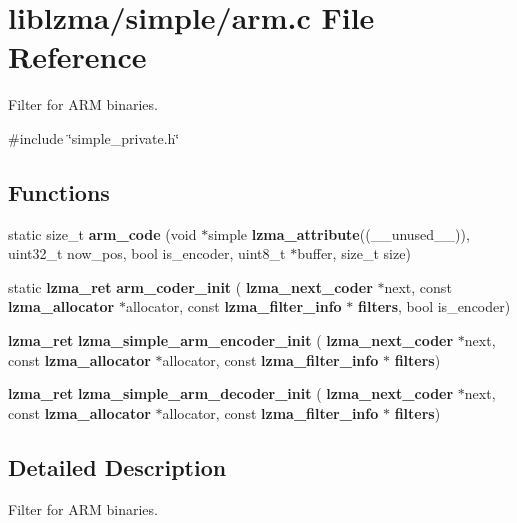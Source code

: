 \section{liblzma/simple/arm.c File Reference}
\label{arm_8c}


Filter for A\+RM binaries.  


{\ttfamily \#include \char`\"{}simple\+\_\+private.\+h\char`\"{}}\newline
\subsection*{Functions}
\begin{DoxyCompactItemize}
\item 
\mbox{\label{arm_8c_ab720caba6c4a0d85ef474f961e436c71}} 
static size\+\_\+t {\bfseries arm\+\_\+code} (void $\ast$simple \textbf{ lzma\+\_\+attribute}((\+\_\+\+\_\+unused\+\_\+\+\_\+)), uint32\+\_\+t now\+\_\+pos, bool is\+\_\+encoder, uint8\+\_\+t $\ast$buffer, size\+\_\+t size)
\item 
\mbox{\label{arm_8c_a13f158655ff14b7f9e42a7b0d5116772}} 
static \textbf{ lzma\+\_\+ret} {\bfseries arm\+\_\+coder\+\_\+init} (\textbf{ lzma\+\_\+next\+\_\+coder} $\ast$next, const \textbf{ lzma\+\_\+allocator} $\ast$allocator, const \textbf{ lzma\+\_\+filter\+\_\+info} $\ast$\textbf{ filters}, bool is\+\_\+encoder)
\item 
\mbox{\label{arm_8c_a053f8568d6b448ef988a91a3c8394f76}} 
\textbf{ lzma\+\_\+ret} {\bfseries lzma\+\_\+simple\+\_\+arm\+\_\+encoder\+\_\+init} (\textbf{ lzma\+\_\+next\+\_\+coder} $\ast$next, const \textbf{ lzma\+\_\+allocator} $\ast$allocator, const \textbf{ lzma\+\_\+filter\+\_\+info} $\ast$\textbf{ filters})
\item 
\mbox{\label{arm_8c_a8400313e2702a9f9ea3f4ac752cf0e56}} 
\textbf{ lzma\+\_\+ret} {\bfseries lzma\+\_\+simple\+\_\+arm\+\_\+decoder\+\_\+init} (\textbf{ lzma\+\_\+next\+\_\+coder} $\ast$next, const \textbf{ lzma\+\_\+allocator} $\ast$allocator, const \textbf{ lzma\+\_\+filter\+\_\+info} $\ast$\textbf{ filters})
\end{DoxyCompactItemize}


\subsection{Detailed Description}
Filter for A\+RM binaries. 

